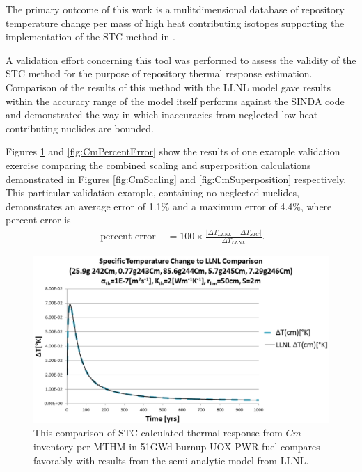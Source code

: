 
The primary outcome of this work is a mulitdimensional database of repository temperature 
change per mass of high heat contributing isotopes supporting the implementation 
of the \gls{STC} method in \Cyder. 

A validation effort concerning this tool was performed to assess the validity 
of the \gls{STC} method for the purpose of repository thermal response 
estimation.  Comparison of the results of this method with the \gls{LLNL} model 
\cite{greenberg_application_2012} gave results within the accuracy range of the 
model itself performs against the SINDA code \cite{huff_numerical_2012} and 
demonstrated the way in which inaccuracies from neglected low heat contributing 
nuclides are bounded. 

Figures \ref{fig:CmValidation} and \ref{fig:CmPercentError} show the results of 
one example validation exercise comparing the combined scaling and  
superposition calculations demonstrated in Figures \ref{fig:CmScaling} and 
\ref{fig:CmSuperposition} respectively. This particular validation example, 
containing no neglected nuclides, demonstrates an average error of 1.1\% and a 
maximum error of 4.4\%, where percent error is 
\begin{align}
\mbox{ percent error } &= 100\times\frac{\left|\Delta T_{LLNL} - \Delta T_{STC}\right|}{ \Delta T_{LLNL}}.
\end{align}

\begin{figure}[htp!]
\begin{center}
\includegraphics[width=\columnwidth]{./chapters/methodology/thermal_models/CmValidation.eps}
\end{center}
\caption{This comparison of \gls{STC} calculated thermal response from $Cm$ 
inventory per MTHM in 51GWd burnup UOX PWR fuel compares favorably with results 
from the semi-analytic model from LLNL.} 
\label{fig:CmValidation}
\end{figure}

